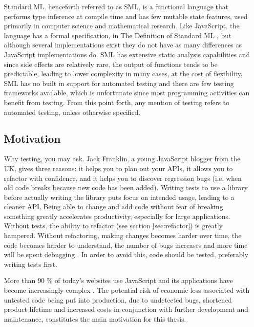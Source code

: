 \documentclass[11pt]{article}
\begin{document}
Standard ML, henceforth referred to as SML, is a functional language that performs type inference at compile time and has few mutable state features, used primarily in computer science and mathematical research. Like JavaScript, the language has a formal specification, in The Definition of Standard ML \cite{DefinitionStandardML}, but although several implementations exist they do not have as many differences as JavaScript implementations do. SML has extensive static analysis capabilities and since side effects are relatively rare, the output of functions tends to be predictable, leading to lower complexity in many cases, at the cost of flexibility. SML has no built in support for automated testing and there are few testing frameworks available, which is unfortunate since most programming activities can benefit from testing. From this point forth, any mention of testing refers to automated testing, unless otherwise specified.

\subsection{Motivation}
\label{sec:motivation}

Why testing, you may ask. Jack Franklin, a young JavaScript blogger from the UK, gives three reasons: it helps you to plan out your APIs, it allows you to refactor with confidence, and it helps you to discover regression bugs (i.e. when old code breaks because new code has been added). Writing tests to use a library before actually writing the library puts focus on intended usage, leading to a cleaner API. Being able to change and add code without fear of breaking something greatly accelerates productivity, especially for large applications. \cite{JackFranklin} Without tests, the ability to refactor (see section \ref{sec:refactor}) is greatly hampered. Without refactoring, making changes becomes harder over time, the code becomes harder to understand, the number of bugs increases and more time will be spent debugging \cite[p.~47-49]{Refactoring}. In order to avoid this, code should be tested, preferably writing tests first.

More than 90 \% of today's websites use JavaScript \cite{BusinessJavascript} and its applications have become increasingly complex \cite[question~23]{Ekelof}. The potential risk of economic loss associated with untested code being put into production, due to undetected bugs, shortened product lifetime and increased costs in conjunction with further development and maintenance, constitutes the main motivation for this thesis.
\end{document}

